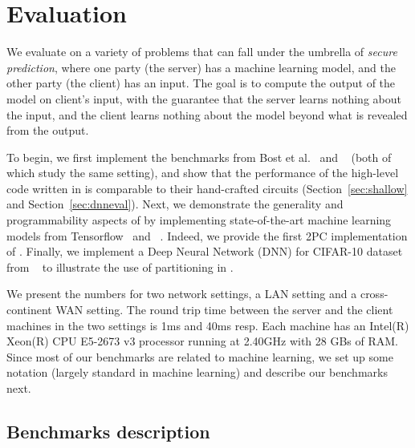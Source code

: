 \section{Evaluation}
\label{sec:eval}
We evaluate \tool on a variety of problems that can fall under the umbrella of {\it secure prediction}, where one
party (the server) has a machine learning model, and the other party
(the client) has an input. The goal is to compute the output of the
model on client's input, with the guarantee that the server
learns nothing about the input, and the client learns nothing
about the model beyond what is revealed from the output.

To begin, we first implement the benchmarks from Bost et al.~\cite{shafindss}
and \minion~\cite{minionn} (both of which study the same setting),
and show that the performance of the high-level code written in \tool
is comparable to their hand-crafted circuits
(Section~\ref{sec:shallow} and Section~\ref{sec:dnneval}).
%
Next, we demonstrate the generality and programmability aspects of
\tool by implementing state-of-the-art machine learning models from
Tensorflow~\cite{tensorflow} and \bonsai~\cite{bonsai}. Indeed, we
provide the first 2PC implementation of \bonsai.
%
Finally, we
implement a Deep Neural Network (DNN) for CIFAR-10
dataset~\cite{cifar} from \minion~\cite{minionn} to illustrate the use
of partitioning in \tool.

We present the numbers for two network settings, a LAN setting and
a cross-continent WAN setting. The round trip time between the server
and the client machines in the two settings is 1ms and 40ms resp. Each
machine has an Intel(R) Xeon(R) CPU E5-2673 v3 processor running at
2.40GHz with 28 GBs of RAM.
%
Since most of our benchmarks
are related to machine learning, we set up some notation (largely
standard in machine learning) and describe our benchmarks next.

\subsection{Benchmarks description}

